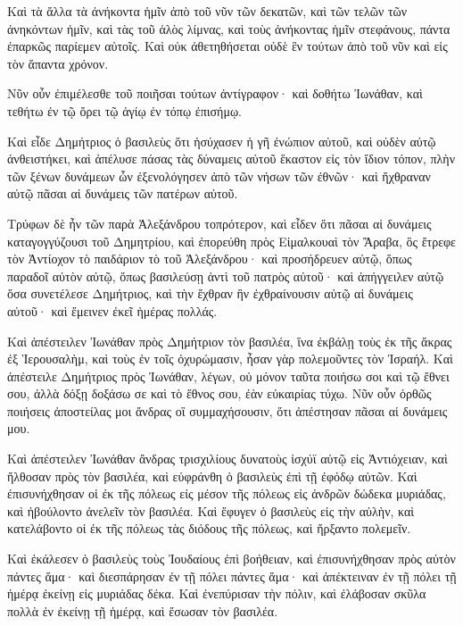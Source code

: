 {\par }{\PP {}Καὶ τὰ ἄλλα τὰ ἀνήκοντα ἡμῖν ἀπὸ τοῦ νῦν τῶν δεκατῶν, καὶ τῶν τελῶν τῶν ἀνηκόντων ἡμῖν, καὶ τὰς τοῦ ἁλὸς λίμνας, καὶ τοὺς ἀνήκοντας ἡμῖν στεφάνους, πάντα ἐπαρκῶς παρίεμεν αὐτοῖς.
Καὶ οὐκ ἀθετηθήσεται οὐδὲ ἓν τούτων ἀπὸ τοῦ νῦν καὶ εἰς τὸν ἅπαντα χρόνον.
\par }{\PP {}Νῦν οὖν ἐπιμέλεσθε τοῦ ποιῆσαι τούτων ἀντίγραφον· καὶ δοθήτω Ἰωνάθαν, καὶ τεθήτω ἐν τῷ ὄρει τῷ ἁγίῳ ἐν τόπῳ ἐπισήμῳ.
\par }{\PP {}Καὶ εἶδε Δημήτριος ὁ βασιλεὺς ὅτι ἡσύχασεν ἡ γῆ ἐνώπιον αὐτοῦ, καὶ οὐδὲν αὐτῷ ἀνθειστήκει, καὶ ἀπέλυσε πάσας τὰς δύναμεις αὐτοῦ ἕκαστον εἰς τὸν ἴδιον τόπον, πλὴν τῶν ξένων δυνάμεων ὧν ἐξενολόγησεν ἀπὸ τῶν νήσων τῶν ἐθνῶν· καὶ ἤχθραναν αὐτῷ πᾶσαι αἱ δυνάμεις τῶν πατέρων αὐτοῦ.
\par }{\PP {}Τρύφων δὲ ἦν τῶν παρὰ Ἀλεξάνδρου τοπρότερον, καὶ εἶδεν ὅτι πᾶσαι αἱ δυνάμεις καταγογγύζουσι τοῦ Δημητρίου, καὶ ἐπορεύθη πρὸς Εἰμαλκουαὶ τὸν Ἄραβα, ὃς ἔτρεφε τὸν Ἀντίοχον τὸ παιδάριον τὸ τοῦ Ἀλεξάνδρου·
καὶ προσήδρευεν αὐτῷ, ὅπως παραδοῖ αὐτὸν αὐτῷ, ὅπως βασιλεύσῃ ἀντὶ τοῦ πατρὸς αὐτοῦ· καὶ ἀπήγγειλεν αὐτῷ ὅσα συνετέλεσε Δημήτριος, καὶ τὴν ἔχθραν ἣν ἐχθραίνουσιν αὐτῷ αἱ δυνάμεις αὐτοῦ· καὶ ἔμεινεν ἐκεῖ ἡμέρας πολλάς.
\par }{\PP {}Καὶ ἀπέστειλεν Ἰωνάθαν πρὸς Δημήτριον τὸν βασιλέα, ἵνα ἐκβάλῃ τοὺς ἐκ τῆς ἄκρας ἐξ Ἱερουσαλὴμ, καὶ τοὺς ἐν τοῖς ὀχυρώμασιν, ἦσαν γὰρ πολεμοῦντες τὸν Ἰσραήλ.
Καὶ ἀπέστειλε Δημήτριος πρὸς Ἰωνάθαν, λέγων, οὐ μόνον ταῦτα ποιήσω σοι καὶ τῷ ἔθνει σου, ἀλλὰ δόξῃ δοξάσω σε καὶ τὸ ἔθνος σου, ἐὰν εὐκαιρίας τύχω.
Νῦν οὖν ὀρθῶς ποιήσεις ἀποστείλας μοι ἄνδρας οἳ συμμαχήσουσιν, ὅτι ἀπέστησαν πᾶσαι αἱ δυνάμεις μου.
\par }{\PP {}Καὶ ἀπέστειλεν Ἰωνάθαν ἄνδρας τρισχιλίους δυνατοὺς ἰσχύϊ αὐτῷ εἰς Ἀντιόχειαν, καὶ ἤλθοσαν πρὸς τὸν βασιλέα, καὶ εὐφράνθη ὁ βασιλεὺς ἐπὶ τῇ ἐφόδῳ αὐτῶν.
Καὶ ἐπισυνήχθησαν οἱ ἐκ τῆς πόλεως εἰς μέσον τῆς πόλεως εἰς ἀνδρῶν δώδεκα μυριάδας, καὶ ἠβούλοντο ἀνελεῖν τὸν βασιλέα.
Καὶ ἔφυγεν ὁ βασιλεὺς εἰς τὴν αὐλὴν, καὶ κατελάβοντο οἱ ἐκ τῆς πόλεως τὰς διόδους τῆς πόλεως, καὶ ἤρξαντο πολεμεῖν.
\par }{\PP {}Καὶ ἐκάλεσεν ὁ βασιλεὺς τοὺς Ἰουδαίους ἐπὶ βοήθειαν, καὶ ἐπισυνήχθησαν πρὸς αὐτὸν πάντες ἅμα· καὶ διεσπάρησαν ἐν τῇ πόλει πάντες ἅμα· καὶ ἀπέκτειναν ἐν τῇ πόλει τῇ ἡμέρᾳ ἐκείνῃ εἰς μυριάδας δέκα.
Καὶ ἐνεπύρισαν τὴν πόλιν, καὶ ἐλάβοσαν σκῦλα πολλὰ ἐν ἐκείνῃ τῇ ἡμέρᾳ, καὶ ἔσωσαν τὸν βασιλέα.
}
